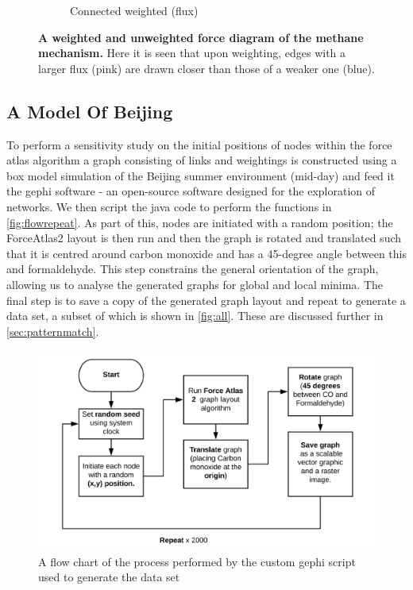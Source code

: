 \begin{figure}[H]
\begin{subfigure}[b]{.4\textwidth}
     \caption{Connected weighted (flux)}
     \end{subfigure}
        \caption{\textbf{A weighted and unweighted force diagram of the methane mechanism.} Here it is seen that upon weighting, edges with a larger flux (pink) are drawn closer than those of a weaker one (blue).}
      \label{fig:resmeth}
\end{figure}


\subsection{A Model Of Beijing}
To perform a sensitivity study on the initial positions of nodes within the force atlas algorithm a graph consisting of links and weightings is constructed using a box model simulation of the Beijing summer environment (mid-day) and feed it the gephi software \citep{gephi} - an open-source software designed for the exploration of networks. We then script the java code to perform the functions in \autoref{fig:flowrepeat}. As part of this, nodes are initiated with a random position; the ForceAtlas2 layout is then run and then the graph is rotated and translated such that it is centred around carbon monoxide and has a 45-degree angle between this and formaldehyde. This step constrains the general orientation of the graph, allowing us to analyse the generated graphs for global and local minima. The final step is to save a copy of the generated graph layout and repeat to generate a data set, a subset of which is shown in  \autoref{fig:all}. These are discussed further in \autoref{sec:patternmatch}.

    \begin{figure}[H]
         \centering
     \includegraphics[width=\textwidth]{figures_c1/flowrepeat.png}
     \caption{ A flow chart of the process performed by the custom gephi script used to generate the data set}
     \label{fig:flowrepeat}
     \end{figure}

